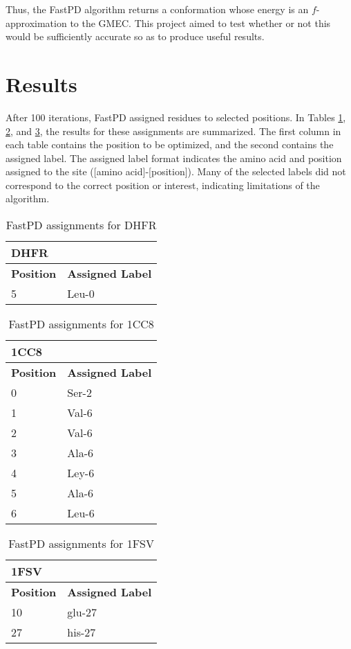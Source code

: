 \documentclass[11pt]{article}
\begin{document}
	Thus, the FastPD algorithm returns a conformation whose energy is an $f$-
	approximation to the GMEC. This project aimed to test whether or not this would
	be sufficiently accurate so as to produce useful results. 

\section{Results}
After 100 iterations, FastPD assigned residues to selected positions.  In Tables \ref{dhfr}, \ref{1cc8}, and \ref{1fsv}, the results for these assignments are summarized.  The first column in each table contains the position to be optimized, and the second contains the assigned label.  The assigned label format indicates the amino acid and position assigned to the site ([amino acid]-[position]).  Many of the selected labels did not correspond to the correct position or interest, indicating limitations of the algorithm. 
\begin{table}[h]
\center
\begin{tabular}{@{}ll@{}}
\toprule
DHFR     &                \\ \midrule
\textbf{Position} & \textbf{Assigned Label} \\
5        & Leu-0          \\ \bottomrule
\end{tabular}
\caption{FastPD assignments for DHFR}
\label{dhfr}
\end{table}

\begin{table}[h]
\center
\begin{tabular}{@{}ll@{}}
\toprule
1CC8     &                \\ \midrule
\textbf{Position} & \textbf{Assigned Label} \\
0        & Ser-2          \\
1        & Val-6          \\
2        & Val-6          \\
3        & Ala-6          \\
4        & Ley-6          \\
5        & Ala-6          \\
6        & Leu-6          \\ \bottomrule
\end{tabular}
\caption{FastPD assignments for 1CC8}
\label{1cc8}
\end{table}

\begin{table}[h]
\center
\begin{tabular}{@{}ll@{}}
\toprule
1FSV     &                \\ \midrule
\textbf{Position} & \textbf{Assigned Label} \\
10       & glu-27         \\
27       & his-27         \\ \bottomrule
\end{tabular}
\caption{FastPD assignments for 1FSV}
\label{1fsv}
\end{table}
\end{document}
